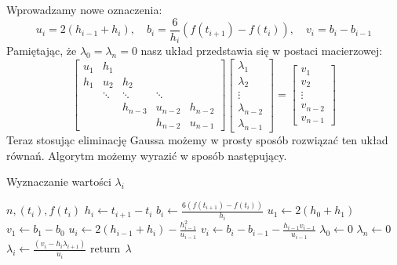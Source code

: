 \documentclass[a4paper]{article}
\begin{document}
    Wprowadzamy nowe oznaczenia:
    \[
        u_i = 2(h_{i-1} + h_i), \quad b_i = \frac{6}{h_i}(f(t_{i+1}) - f(t_i)), \quad v_i = b_i - b_{i-1}
    \]
    Pamiętając, że $\lambda_0 = \lambda_n = 0$ nasz układ przedstawia się w postaci macierzowej:
    \[
        \begin{bmatrix}
            u_1 & h_1 & & & \\
            h_1 & u_2 & h_2 & & \\
                & \ddots & \ddots & \ddots & \\
                & & h_{n-3} & u_{n-2} & h_{n-2} \\
                & & & h_{n-2} & u_{n-1}
        \end{bmatrix}
        \begin{bmatrix}
            \lambda_1 \\
            \lambda_2 \\
            \vdots \\
            \lambda_{n-2} \\
            \lambda_{n-1}
        \end{bmatrix}
        =
        \begin{bmatrix}
            v_1 \\
            v_2 \\
            \vdots \\
            v_{n-2} \\
            v_{n-1}
        \end{bmatrix}
    \]
    Teraz stosując eliminację Gaussa możemy w prosty sposób rozwiązać ten układ równań. Algorytm możemy wyrazić w sposób następujący.
    \vspace{5mm}
    \begin{algorithm}
        \caption{Wyznaczanie wartości $\lambda_i$}
        \begin{algorithmic}
        \REQUIRE $n, (t_i), f(t_i)$
                \STATE $h_i \leftarrow t_{i+1} - t_i$
                \STATE $b_i \leftarrow \frac{6(f(t_{i+1}) - f(t_i))}{h_i}$
            \ENDFOR
            \STATE $u_1 \leftarrow 2(h_0 + h_1)$
            \STATE $v_1 \leftarrow b_1 - b_0$
                \STATE $u_i \leftarrow 2(h_{i-1} + h_i) - \frac{h_{i-1}^2}{u_{i-1}}$
                \STATE $v_i \leftarrow b_i - b_{i-1} - \frac{h_{i-1}v_{i-1}}{u_{i-1}}$
            \ENDFOR
            \STATE $\lambda_0 \leftarrow 0$
            \STATE $\lambda_n \leftarrow 0$
                \STATE $\lambda_i \leftarrow \frac{(v_i - h_i\lambda_{i+1})}{u_i}$
            \ENDFOR
            \STATE $\text{return} \ \ \lambda$
        \end{algorithmic}
    \end{algorithm}
\end{document}
